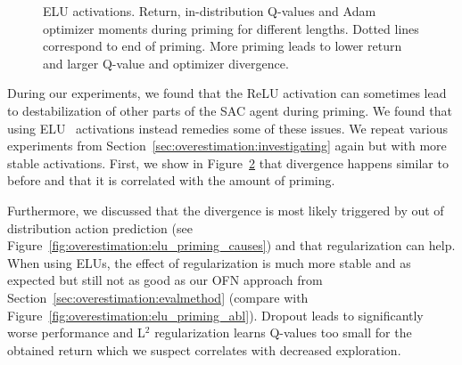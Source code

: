 \begin{figure}[H]
\begin{subfigure}[b]{0.33\textwidth}
        \label{subfig:elu_priming_base_mom}
    \end{subfigure}%
    \vspace{-5pt}
    \caption{ELU activations. Return, in-distribution Q-values and Adam optimizer moments during priming for different lengths. Dotted lines correspond to end of priming. More priming leads to lower return and larger Q-value and optimizer divergence.}
    \label{fig:elu_priming_base}
\end{figure}

During our experiments, we found that the ReLU activation can sometimes lead to destabilization of other parts of the SAC agent during priming. We found that using ELU~\parencite{clevert2016accurate} activations instead remedies some of these issues. We repeat various experiments from Section~\ref{sec:overestimation:investigating} again but with more stable activations. First, we show in Figure~\ref{fig:elu_priming_base} that divergence happens similar to before and that it is correlated with the amount of priming.

Furthermore, we discussed that the divergence is most likely triggered by out of distribution action prediction (see Figure~\ref{fig:overestimation:elu_priming_causes}) and that regularization can help. 
When using ELUs, the effect of regularization is much more stable and as expected but still not as good as our OFN approach from Section~\ref{sec:overestimation:evalmethod} (compare with Figure~\ref{fig:overestimation:elu_priming_abl}). 
Dropout leads to significantly worse performance and L$^2$ regularization learns Q-values too small for the obtained return which we suspect correlates with decreased exploration.

